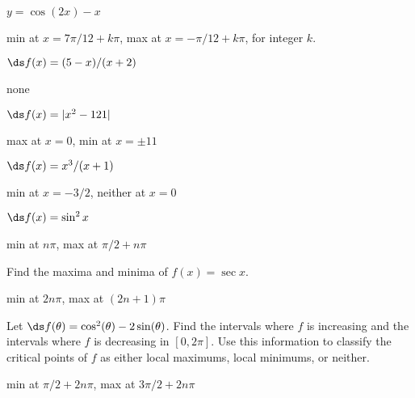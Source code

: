 \begin{enumialphparenastyle}
\begin{ex}
 $y=\cos(2x)-x$ 
\begin{sol}
 min at $x=7\pi/12+k\pi$, max at $x=-\pi/12+k\pi$, for integer $k$.
\end{sol}
\end{ex}

\begin{ex}
$\ds f(x) = (5-x)/(x+2)$
\begin{sol}
 none
\end{sol}
\end{ex}

\begin{ex}
 $\ds f(x) = |x^2 - 121|$
\begin{sol}
 max at $x=0$, min at $x=\pm 11$
\end{sol}
\end{ex}

\begin{ex}
 $\ds f(x) = x^3/(x+1)$
\begin{sol}
 min at $x=-3/2$, neither at $x=0$
\end{sol}
\end{ex}


\begin{ex}
 $\ds f(x) = \sin ^2 x$
\begin{sol}
 min at $n\pi$, max at $\pi/2+n\pi$
\end{sol}
\end{ex}

\begin{ex}
 Find the maxima and minima of $f(x)=\sec x$.
\begin{sol}
 min at $2n\pi$, max at $(2n+1)\pi$
\end{sol}
\end{ex}

\begin{ex}
  Let $\ds f(\theta) = \cos^2(\theta) -
 2\sin(\theta)$.  Find the intervals where $f$ is increasing and the
 intervals where $f$ is decreasing in $[0,2\pi]$.  Use this
 information to classify the critical points of $f$ as either local
 maximums, local minimums, or neither.
\begin{sol}
 min at $\pi/2+2n\pi$, max at $3\pi/2+2n\pi$
\end{sol}
\end{ex}


\end{enumialphparenastyle}
